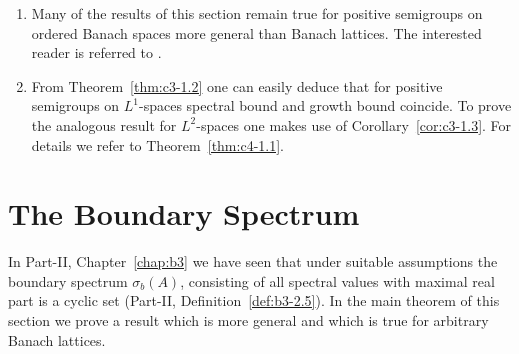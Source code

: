 \begin{remarks}\label{rem:c3-1.7}
\begin{enumerate}[\upshape (i), wide, labelindent=.25em]
	\item 
	Many of the results of this section remain true for positive semigroups on ordered Banach spaces more general than Banach lattices.
	The interested reader is referred to \textcite{greinervoigtwolff:1981}.
	
	\item 
	From Theorem~\ref{thm:c3-1.2} one can easily deduce that for positive semigroups on $L^1$-spaces spectral bound and growth bound coincide.
	To prove the analogous result for $L^2$-spaces one makes use of Corollary~\ref{cor:c3-1.3}.
	For details we refer to Theorem~\ref{thm:c4-1.1}.
\end{enumerate}
\end{remarks}

\section{The Boundary Spectrum}\label{sec:c3-2}
In Part-II, Chapter~\ref{chap:b3} we have seen that under suitable assumptions the boundary spectrum $\sigma_{b}(A)$, consisting of all spectral values with maximal real part is a cyclic set (\cf Part-II, Definition~\ref{def:b3-2.5}).
In the main theorem of this section we prove a result which is more general and which is true for arbitrary Banach lattices.

